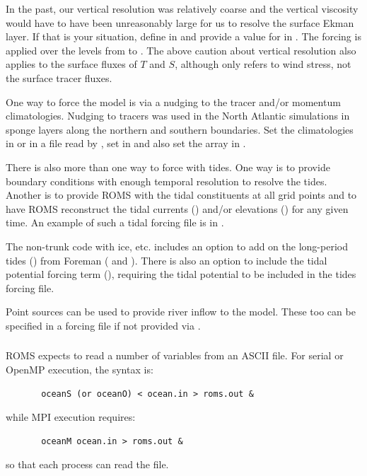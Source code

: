 In the past, our vertical resolution was relatively coarse and the
vertical viscosity would have to have been unreasonably large for
us to resolve the surface Ekman layer.  If that is your situation,
define  in  and provide a value for
 in .  The forcing is applied over the
levels from  to .  The above caution about
vertical resolution also applies to the surface fluxes of $T$ and
$S$, although  only refers to wind stress, not the
surface tracer fluxes.

\smallskip
{}

One way to force the model is via a nudging to the tracer and/or
momentum climatologies. Nudging to tracers was used in the North
Atlantic simulations in sponge layers along the northern and southern
boundaries. Set the climatologies in  or in a
file read by , set  in
 and also set the array  in
.

\smallskip
{}

There is also more than one way to force with tides. One way is to
provide boundary conditions with enough temporal resolution to
resolve the tides. Another is to provide ROMS with the tidal
constituents at all grid points and to have ROMS reconstruct the
tidal currents ()  and/or elevations ()
for any given time. An example of such a tidal forcing file is in
.

The non-trunk code with ice, etc. includes an option to
add on the long-period tides () from Foreman
(\cite{Foreman_96a} and \cite{Foreman_96b}). There is also an option to include the tidal potential
forcing term (), requiring the tidal potential to
be included in the tides forcing file.

\smallskip
{}

Point sources can be used to provide river inflow to the model.
These too can be specified in a forcing file if not provided via
.

\subsubsection{}
\label{ASCII_in}
ROMS expects to read a number of variables from an ASCII file.
For serial or OpenMP execution, the syntax is:
\begin{verbatim}
       oceanS (or oceanO) < ocean.in > roms.out &
\end{verbatim}
while MPI execution requires:
\begin{verbatim}
       oceanM ocean.in > roms.out &
\end{verbatim}
so that each process can read the file.

